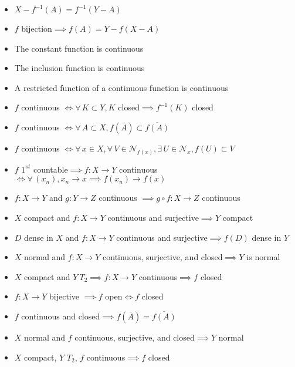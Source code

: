 \documentclass[letterpaper,12pt,fleqn]{article}
\newcommand{\fc}{\(1^{st}\) countable}
\renewcommand{\N}{\mathcal{N}}
\begin{document}
\begin{itemize}
\item \(X-f^{-1}(A)=f^{-1}(Y-A)\)

\item \(f\) bijection\(\implies f(A)=Y-f(X-A)\)

\item The constant function is continuous

\item The inclusion function is continuous

\item A restricted function of a continuous function is continuous

\item \(f\) continuous \(\iff\forall\,K\subset Y, K\) closed\(\implies f^{-1}(K)\) closed

\item \(f\) continuous \(\iff\forall\,A\subset X, f(\bar{A})\subset\overline{f(A)}\)

\item \(f\) continuous \(\iff\forall\,x\in X,\forall\,V\in\N_{f(x)},\exists\,U\in\N_x,f(U)\subset V\)

\item \(f\) \fc\(\implies f:X\to Y\) continuous \(\iff\forall\,(x_n),x_n\to x\implies f(x_n)\to f(x)\)

\item \(f:X\to Y\) and \(g:Y\to Z\) continuous \(\implies g\circ f:X\to Z\) continuous

\item \(X\) compact and \(f:X\to Y\) continuous and surjective\(\implies Y\) compact

\item \(D\) dense in \(X\) and \(f:X\to Y\) continuous and surjective\(\implies f(D)\) dense in \(Y\)

\item \(X\) normal and \(f:X\to Y\) continuous, surjective, and closed\(\implies Y\) is normal

\item \(X\) compact and \(Y\ T_2\implies f:X\to Y\) continuous\(\implies f\) closed

\item \(f:X\to Y\) bijective \(\implies f\) open\(\iff f\) closed

\item \(f\) continuous and closed\(\implies f(\bar{A})=\overline{f(A)}\)

\item \(X\) normal and \(f\) continuous, surjective, and closed\(\implies Y\) normal

\item \(X\) compact, \(Y\) \(T_2\), \(f\) continuous\(\implies f\) closed
\end{itemize}
\end{document}
